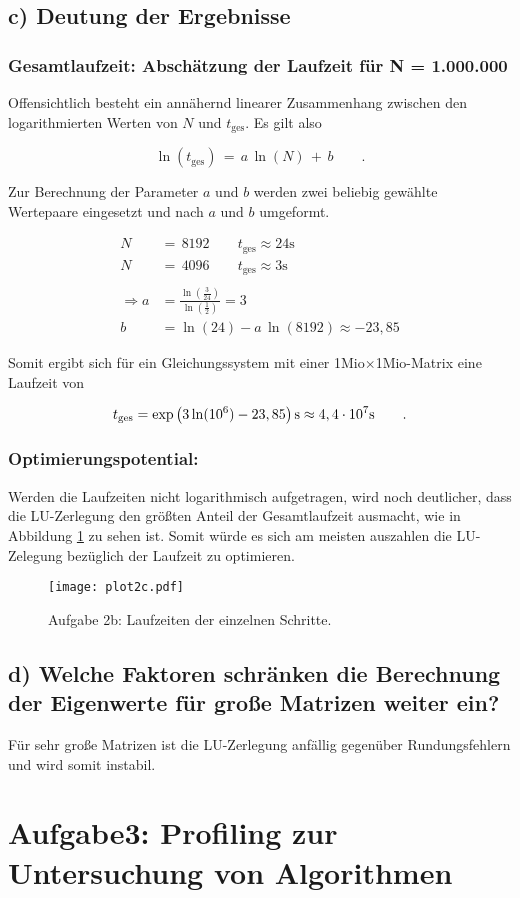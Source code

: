 \subsection*{c) Deutung der Ergebnisse}

\subsubsection*{Gesamtlaufzeit: Abschätzung der Laufzeit für N = 1.000.000}
Offensichtlich besteht ein annähernd linearer Zusammenhang zwischen den logarithmierten Werten von $N$ und $t_{\text{ges}}$. Es gilt also

\begin{equation*}
 \ln(t_{\text{ges}})\, = \, a\,\ln(N)\, +\, b \qquad .
\end{equation*}

\noindent Zur Berechnung der Parameter $a$ und $b$ werden zwei beliebig gewählte Wertepaare eingesetzt und nach $a$ und $b$ umgeformt.

\begin{align*}
  N\,&=\,8192 \qquad t_{\text{ges}} \approx 24 \text{s} \\
  N\,&=\,4096 \qquad t_{\text{ges}} \approx 3 \text{s}\\
  \\
  \Rightarrow a & = \frac{\ln\left(\frac{3}{24}\right)}{\ln\left(\frac{1}{2}\right)} = 3 \\
  b & = \ln(24)-a\, \ln(8192) \approx - 23,85
\end{align*}

Somit ergibt sich für ein Gleichungssystem mit einer 1Mio$\times$1Mio-Matrix eine Laufzeit von

\begin{equation*}
  t_{\text{ges}} = \exp\left(3\ln(10^6)-23,85\right) \text s \approx 4,4 \cdot 10^{7} \text{s} \qquad .
\end{equation*}

\subsubsection*{Optimierungspotential:}
Werden die Laufzeiten nicht logarithmisch aufgetragen, wird noch deutlicher, dass die LU-Zerlegung den größten Anteil der Gesamtlaufzeit ausmacht, wie in Abbildung \ref{fig:plot2c} zu sehen ist. Somit würde es sich am meisten auszahlen die LU-Zelegung bezüglich der Laufzeit zu optimieren.

\FloatBarrier
\begin{figure}[h]
    \centering
    \texttt{[image: plot2c.pdf]}
    \caption{Aufgabe 2b: Laufzeiten der einzelnen Schritte.}
    \label{fig:plot2c}
\end{figure}
\FloatBarrier

\subsection*{d) Welche Faktoren schränken die Berechnung der Eigenwerte für große Matrizen weiter ein?}
Für sehr große Matrizen ist die LU-Zerlegung anfällig gegenüber Rundungsfehlern und wird somit instabil.

\section*{Aufgabe3: Profiling zur Untersuchung von Algorithmen}


